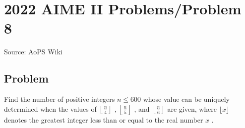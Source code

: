 \documentclass[12pt]{article}
\begin{document}
\section*{{2022 AIME II Problems/Problem 8}}
Source: AoPS Wiki

\subsection*{Problem}
Find the number of positive integers $n \le 600$ whose value can be uniquely determined when the values of $\left\lfloor \frac n4\right\rfloor$ , $\left\lfloor\frac n5\right\rfloor$ , and $\left\lfloor\frac n6\right\rfloor$ are given, where $\lfloor x \rfloor$ denotes the greatest integer less than or equal to the real number $x$ .
\end{document}
